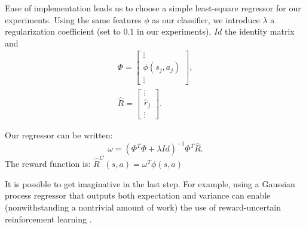 \documentclass[smallextended]{svjour3}
\begin{document}
Ease of implementation leads us to choose a simple least-square regressor for our experiments. Using the same features $\phi$ as our classifier, we introduce $\lambda$ a regularization coefficient (set to $0.1$ in our experiments), $Id$ the identity matrix and 
\begin{eqnarray}
  \Phi = \begin{bmatrix}
    \vdots\\
    \phi(s_j,a_j)\\
    \vdots
  \end{bmatrix},\\
  \hat R = \begin{bmatrix}
    \vdots\\
    \hat r_j\\
    \vdots
  \end{bmatrix}.
\end{eqnarray}

Our regressor can be written:
\begin{equation}
  \omega = (\Phi^T\Phi + \lambda Id)^{-1}\Phi^T\hat R.
\end{equation}
The reward function is: $\hat R^C(s,a) = \omega^T \phi(s,a)$

It is possible to get imaginative in the last step. For example, using a Gaussian process regressor \cite{rasmussen2006gaussian} that outputs both expectation and variance can enable (nonwithstanding a nontrivial amount of work) the use of reward-uncertain reinforcement learning \cite{regan2011robust}. 
\end{document}

